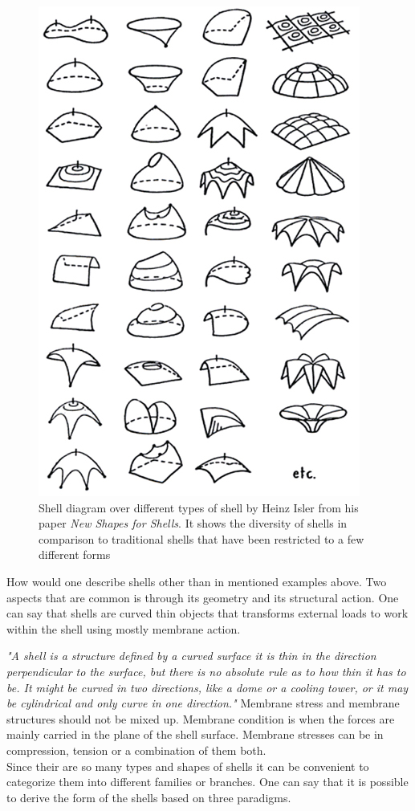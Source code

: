 \begin{figure}[H]
\centering
\includegraphics[width=0.6\linewidth ]{figure/Introduction/ShellDiagram.jpg}
\caption{Shell diagram over different types of shell by Heinz Isler from his paper \textit{New Shapes for Shells}. It shows the diversity of shells in comparison to traditional shells that have been restricted to a few different forms}
\label{fig:shells}
\end{figure}

How would one describe shells other than in mentioned examples above. Two aspects that are common is through its geometry and its structural action. One can say that shells are curved thin objects that transforms external loads to work within the shell using mostly membrane action.

\textit{"A shell is a structure defined by a curved surface it is thin in the direction perpendicular to the surface, but there is no absolute rule as to how thin it has to be. It might be curved in two directions, like a dome or a cooling tower, or it may be cylindrical and only curve in one direction."}  \cite{ref:ShellOpt}
Membrane stress and membrane structures should not be mixed up. Membrane condition is when the forces are mainly carried in the plane of the shell surface. Membrane stresses can be in compression, tension or a combination of them both. \\


Since their are so many types and shapes of shells it can be convenient to categorize them into different families or branches. One can say that it is possible to derive the form of the shells based on three paradigms. \cite{ref:ShellOpt} 

